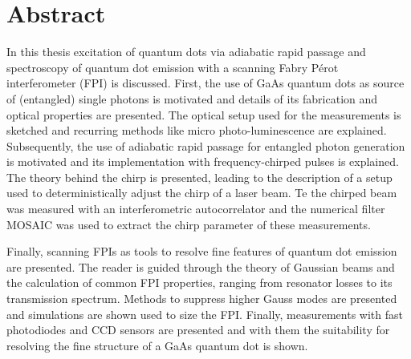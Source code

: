 

\chapter*{Abstract}
\label{cha:abstract}


In this thesis excitation of quantum dots via adiabatic rapid passage and spectroscopy of quantum dot emission with a scanning Fabry Pérot interferometer (FPI) is discussed.
First, the use of GaAs quantum dots as source of (entangled) single photons is motivated and details of its fabrication and optical properties are presented.
The optical setup used for the measurements is sketched and recurring methods like micro photo-luminescence are explained.
Subsequently, the use of adiabatic rapid passage for entangled photon generation is motivated and its implementation with frequency-chirped pulses is explained.
The theory behind the chirp is presented, leading to the description of a setup used to deterministically adjust the chirp of a laser beam.
Te the chirped beam was measured with an interferometric autocorrelator and the numerical filter MOSAIC was used to extract the chirp parameter of these measurements.

Finally, scanning FPIs as tools to resolve fine features of quantum dot emission are presented.
The reader is guided through the theory of Gaussian beams and the calculation of common FPI properties, ranging from resonator losses to its transmission spectrum.
Methods to suppress higher Gauss modes are presented and simulations are shown used to size the FPI.
Finally, measurements with fast photodiodes and CCD sensors are presented and with them the suitability for resolving the fine structure of a GaAs quantum dot is shown.   


